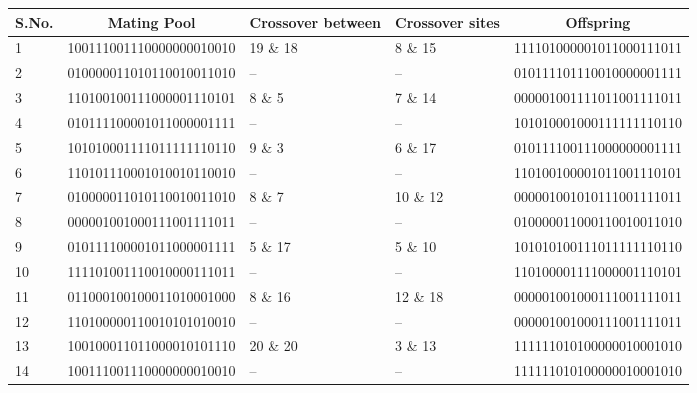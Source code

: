 \begin{table}[htb]
  \footnotesize
  \centering
  \renewcommand{\arraystretch}{1.2}
  \begin{tabular}{@{} l c p{1.5cm} p{1.5cm} c @{}}
    \toprule
    S.No. & Mating Pool & Crossover between & Crossover sites & Offspring \\
   \midrule    
    1 & 100111001110000000010010 & 19 \& 18 & 8 \& 15 &  111101000001011000111011 \\
    
    2 & 010000011010110010011010 & -- & -- & 010111101110010000001111 \\
    
    3 & 110100100111000001110101 & 8 \& 5 & 7 \& 14 & 000001001111011001111011 \\

    4 & 010111100001011000001111 & -- & -- & 101010001000111111110110 \\

    5 & 101010001111011111110110 & 9 \& 3 & 6 \& 17 & 	010111100111000000001111 \\
    
    6 & 110101110001010010110010 & -- & -- & 110100100001011001110101 \\
    
    7 & 010000011010110010011010 & 8 \& 7 & 10 \& 12 & 000001001010111001111011 \\
    
    8 & 000001001000111001111011 & -- & -- & 010000011000110010011010 \\

    9 & 010111100001011000001111 & 5 \& 17 & 5 \& 10 & 	101010100111011111110110 \\

    10 & 111101001110010000111011 & -- & -- & 110100001111000001110101 \\

    11 & 011000100100011010001000 & 8 \& 16 & 12 \& 18 & 	000001001000111001111011 \\
    
    12 & 110100000110010101010010 & -- & -- & 000001001000111001111011 \\
    
    13 & 100100011011000010101110 & 20 \& 20 & 3 \& 13 & 	111111010100000010001010 \\
    
    14 & 100111001110000000010010 & -- & -- & 111111010100000010001010 \\
    

\end{tabular}
\end{table}
